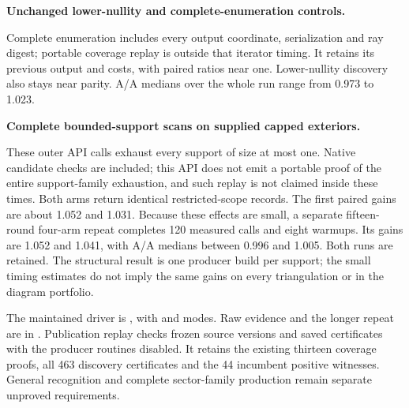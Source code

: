 \begin{samepage}
\noindent\textbf{Unchanged lower-nullity and complete-enumeration controls.}

\end{samepage}

Complete enumeration includes every output coordinate, serialization and
ray digest; portable coverage replay is outside that iterator timing.
It retains its previous output and costs, with paired ratios near one.
Lower-nullity discovery also stays near parity. A/A medians over the whole
run range from 0.973 to 1.023.

\begin{samepage}
\noindent\textbf{Complete bounded-support scans on supplied capped exteriors.}

\end{samepage}

These outer API calls exhaust every support of size at most one. Native
candidate checks are included; this API does not emit a portable proof
of the entire support-family exhaustion, and such replay is not claimed
inside these times. Both arms return identical restricted-scope records.
The first paired gains are about 1.052 and 1.031. Because these effects
are small, a separate fifteen-round four-arm repeat completes 120 measured
calls and eight warmups. Its gains are 1.052 and 1.041, with A/A medians
between 0.996 and 1.005. Both runs are retained. The structural result is
one producer build per support; the small timing estimates do not imply
the same gains on every triangulation or in the diagram portfolio.

\begin{sloppypar}
The maintained driver is ,
with  and  modes.
Raw evidence and the longer repeat are in .
Publication replay checks frozen source versions and saved certificates
with the producer routines disabled. It retains the existing thirteen
coverage proofs, all 463 discovery certificates and the 44 incumbent
positive witnesses. General recognition and complete sector-family
production remain separate unproved requirements.
\end{sloppypar}
